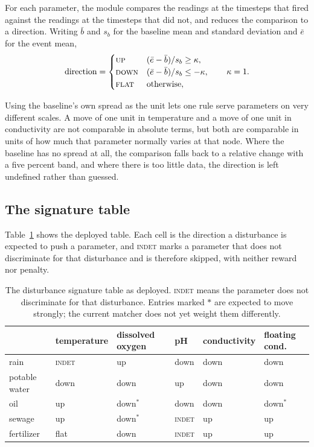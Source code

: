 \documentclass{article}
\begin{document}
For each parameter, the module compares the readings at the timesteps that
fired against the readings at the timesteps that did not, and reduces the
comparison to a direction. Writing $\bar{b}$ and $s_{b}$ for the baseline mean
and standard deviation and $\bar{e}$ for the event mean,
\begin{equation}
  \text{direction} =
  \begin{cases}
    \textsc{up}   & (\bar{e} - \bar{b}) / s_{b} \ge \kappa, \\
    \textsc{down} & (\bar{e} - \bar{b}) / s_{b} \le -\kappa, \\
    \textsc{flat} & \text{otherwise},
  \end{cases}
  \qquad \kappa = 1 .
\end{equation}

Using the baseline's own spread as the unit lets one rule serve parameters on
very different scales. A move of one unit in temperature and a move of one
unit in conductivity are not comparable in absolute terms, but both are
comparable in units of how much that parameter normally varies at that node.
Where the baseline has no spread at all, the comparison falls back to a
relative change with a five percent band, and where there is too little data,
the direction is left undefined rather than guessed.

\subsection{The signature table}

Table~\ref{tab:signatures} shows the deployed table. Each cell is the direction
a disturbance is expected to push a parameter, and \textsc{indet} marks a
parameter that does not discriminate for that disturbance and is therefore
skipped, with neither reward nor penalty.

\begin{table}[t]
  \centering
  \caption{The disturbance signature table as deployed. \textsc{indet} means the
    parameter does not discriminate for that disturbance. Entries marked $\ast$
    are expected to move strongly; the current matcher does not yet weight
    them differently.}
  \label{tab:signatures}
  \begin{tabular}{llllll}
    \toprule
    & temperature & dissolved oxygen & pH & conductivity & floating cond. \\
    \midrule
    rain       & \textsc{indet} & up   & down & down & down \\
    potable water   & down           & down & up   & down & down \\
    oil        & up             & down$^{\ast}$ & down & down & down$^{\ast}$ \\
    sewage     & up             & down$^{\ast}$ & \textsc{indet} & up & up \\
    fertilizer & flat           & down & \textsc{indet} & up & up \\
    \bottomrule
  \end{tabular}
\end{table}
\end{document}
